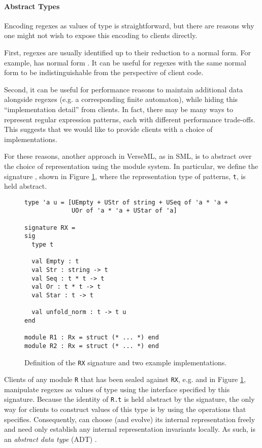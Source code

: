 \paragraph{Abstract Types} Encoding regexes as values of type  is straightforward, but there are reasons why one might not wish to expose this encoding to clients directly. 

First, regexes are usually identified up to their reduction to a normal form. For example,  has normal form . It can be useful for regexes with the same normal form to be  indistinguishable from the perspective of client code. 

Second, it can be useful for performance reasons to maintain additional data alongside regexes (e.g. a corresponding finite automaton), while hiding this ``implementation detail'' from clients. In fact, there may be many ways to represent regular expression patterns, each with different performance trade-offs. This suggests that we would like to provide clients with a choice of implementations. 

For these reasons, another approach in VerseML, as in SML, is to abstract over the choice of representation using  the module system. In particular, we define the {signature} , shown in Figure \ref{fig:signature-RX}, where the representation type of patterns, \lstinline{t}, is held abstract.

\begin{figure}[ht]
\begin{lstlisting}[deletekeywords={case},numbers=none]
type 'a u = [UEmpty + UStr of string + USeq of 'a * 'a + 
             UOr of 'a * 'a + UStar of 'a]

signature RX = 
sig
  type t

  val Empty : t
  val Str : string -> t
  val Seq : t * t -> t
  val Or : t * t -> t
  val Star : t -> t

  val unfold_norm : t -> t u
end

module R1 : Rx = struct (* ... *) end
module R2 : Rx = struct (* ... *) end
\end{lstlisting}
\vspace{-5px}
\caption{Definition of the \lstinline{RX} signature and two example implementations.}
\label{fig:signature-RX}
\end{figure}

Clients of any module \lstinline{R} that has been sealed against \lstinline{RX}, e.g.  and   in Figure \ref{fig:signature-RX}, manipulate regexes as values of type  using the interface specified by this signature. Because the identity of \lstinline{R.t} is held abstract by the signature, the only way for clients to construct values of this type is by using the operations that  specifies. Consequently,  can  choose (and evolve) its internal representation freely and need only establish any internal representation invariants locally. As such,  is an \emph{abstract data type} (ADT) \cite{liskov1974programming}.

